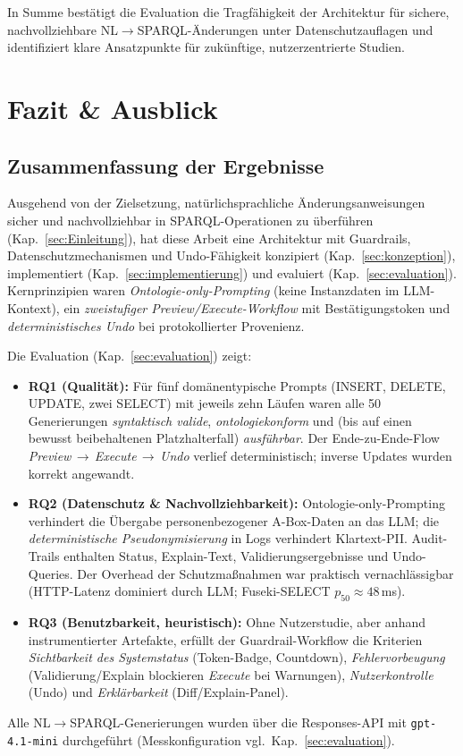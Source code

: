 In Summe bestätigt die Evaluation die Tragfähigkeit der Architektur für sichere, nachvollziehbare NL$\rightarrow$SPARQL-Änderungen unter Datenschutzauflagen und identifiziert klare Ansatzpunkte für zukünftige, nutzerzentrierte Studien.






\chapter{Fazit \& Ausblick}
\label{sec:fazit}

\section{Zusammenfassung der Ergebnisse}
Ausgehend von der Zielsetzung, natürlichsprachliche Änderungsanweisungen sicher und nachvollziehbar in SPARQL-Operationen zu überführen (Kap.~\ref{sec:Einleitung}), hat diese Arbeit eine Architektur mit Guardrails, Datenschutzmechanismen und Undo-Fähigkeit konzipiert (Kap.~\ref{sec:konzeption}), implementiert (Kap.~\ref{sec:implementierung}) und evaluiert (Kap.~\ref{sec:evaluation}). Kernprinzipien waren \emph{Ontologie-only-Prompting} (keine Instanzdaten im LLM-Kontext), ein \emph{zweistufiger Preview/Execute-Workflow} mit Bestätigungstoken und \emph{deterministisches Undo} bei protokollierter Provenienz.

Die Evaluation (Kap.~\ref{sec:evaluation}) zeigt:
\begin{itemize}
  \item \textbf{RQ1 (Qualität):} Für fünf domänentypische Prompts (INSERT, DELETE, UPDATE, zwei SELECT) mit jeweils zehn Läufen waren alle 50 Generierungen \emph{syntaktisch valide}, \emph{ontologiekonform} und (bis auf einen bewusst beibehaltenen Platzhalterfall) \emph{ausführbar}. Der Ende-zu-Ende-Flow \emph{Preview}\,$\to$\,\emph{Execute}\,$\to$\,\emph{Undo} verlief deterministisch; inverse Updates wurden korrekt angewandt.
  \item \textbf{RQ2 (Datenschutz \& Nachvollziehbarkeit):} Ontologie-only-Prompting verhindert die Übergabe personenbezogener A-Box-Daten an das LLM; die \emph{deterministische Pseudonymisierung} in Logs verhindert Klartext-PII. Audit-Trails enthalten Status, Explain-Text, Validierungsergebnisse und Undo-Queries. Der Overhead der Schutzmaßnahmen war praktisch vernachlässigbar (HTTP-Latenz dominiert durch LLM; Fuseki-SELECT $p_{50}\approx 48$\,ms).
  \item \textbf{RQ3 (Benutzbarkeit, heuristisch):} Ohne Nutzerstudie, aber anhand instrumentierter Artefakte, erfüllt der Guardrail-Workflow die Kriterien \emph{Sichtbarkeit des Systemstatus} (Token-Badge, Countdown), \emph{Fehlervorbeugung} (Validierung/Explain blockieren \emph{Execute} bei Warnungen), \emph{Nutzerkontrolle} (Undo) und \emph{Erklärbarkeit} (Diff/Explain-Panel).
\end{itemize}
Alle NL$\to$SPARQL-Generierungen wurden über die Responses-API mit \texttt{gpt-4.1-mini} durchgeführt (Messkonfiguration vgl.\ Kap.~\ref{sec:evaluation}).

